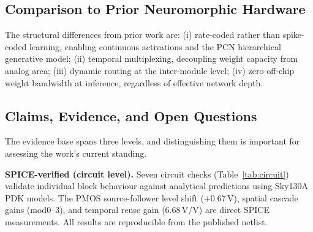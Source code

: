 \documentclass[journal,10pt,twoside]{IEEEtran}
\begin{document}
\subsection{Comparison to Prior Neuromorphic Hardware}

\begin{table}[t]
\caption{Comparison to prior neuromorphic hardware}
\label{tab:prior_work}
\centering
\footnotesize
{}
\end{table}

The structural differences from prior work are:
(i) rate-coded rather than spike-coded learning, enabling continuous
activations and the PCN hierarchical generative model;
(ii) temporal multiplexing, decoupling weight capacity from analog area;
(iii) dynamic routing at the inter-module level;
(iv) zero off-chip weight bandwidth at inference, regardless of effective
network depth.

\subsection{Claims, Evidence, and Open Questions}
\label{sec:validation}

The evidence base spans three levels, and distinguishing them is important
for assessing the work's current standing.

\textbf{SPICE-verified (circuit level).}
Seven circuit checks (Table~\ref{tab:circuit}) validate individual block
behaviour against analytical predictions using Sky130A PDK models.
The PMOS source-follower level shift ($+0.67$\,V), spatial cascade gains
(mod0--3), and temporal reuse gain (6.68\,V/V) are direct SPICE measurements.
All results are reproducible from the published netlist.
\end{document}
